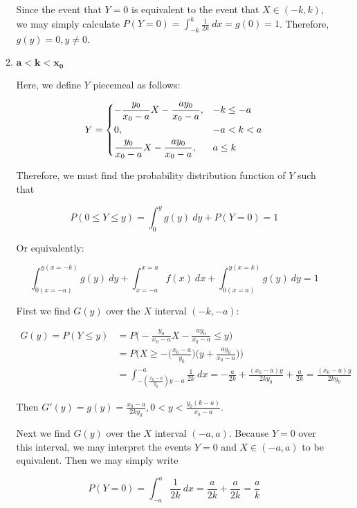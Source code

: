 \documentclass[10pt, oneside]{article}   	%
\theoremstyle{definition}
\begin{document}
\begin{enumerate}[label=5.\arabic*]
\begin{enumerate}
	Since the event that $Y = 0$ is equivalent to the event that $X \in (-k, k)$, we may simply calculate $P(Y = 0) = \int^k_{-k} \frac{1}{2k} \ dx = \boxed{g(0) = 1}$. Therefore, $\boxed{g(y) = 0}, y \neq 0$.
	
	\item  \begin{tcolorbox}[
	  colback=Cerulean!5!white,
	  colframe=Cerulean!75!black]
	\textbf{$\bm{a < k < x_0}$}
	\end{tcolorbox}
	
	Here, we define $Y$ piecemeal as follows:
	
	\[ Y = \begin{dcases}
	-\frac{y_0}{x_0 - a} X - \frac{ay_0}{x_0 - a}, & -k \leq -a \\
	0, &-a < k < a \\
	\frac{y_0}{x_0 - a} X - \frac{ay_0}{x_0 - a}, &a \leq k
	\end{dcases} \]
	
	Therefore, we must find the probability distribution function of $Y$ such that
	
	\[ P(0 \leq Y \leq y) =  \int^y_0 g(y) \ dy + P(Y = 0) = 1 \]
	
	Or equivalently:
	
	\[ \int^{y (x = -k)}_{0 (x = -a)} g(y) \ dy + \int^{x = a}_{x = -a} f(x) \ dx + \int^{y (x = k)}_{0 (x = a)} g(y) \ dy = 1 \]
	
	First we find $G(y)$ over the $X$ interval $(-k, -a)$:
	
	\begin{align*}
	G(y) = P(Y \leq y) &= P\Big( -\frac{y_0}{x_0 - a} X - \frac{ay_0}{x_0 - a} \leq y \Big) \\
	&= P \Big( X \geq - \Big( \frac{x_0 - a}{y_0} \Big) \Big( y + \frac{ay_0}{x_0 - a} \Big) \Big) \\
	&= \int^{-a}_{-(\frac{x_0 - a}{y_0}) y - a} \frac{1}{2k} \ dx = -\frac{a}{2k} + \frac{(x_0 - a)y}{2ky_0} + \frac{a}{2k} = \frac{(x_0 - a)y}{2ky_0}
	\end{align*}
	
	Then $G'(y) = g(y) = \boxed{\frac{x_0 - a}{2ky_0}, 0 < y < \frac{y_0 (k - a)}{x_0 - a}}$.
	
	Next we find $G(y)$ over the $X$ interval $(-a, a)$. Because $Y = 0$ over this interval, we may interpret the events $Y = 0$ and $X \in (-a,a)$ to be equivalent. Then we may simply write
	
	\[ P(Y = 0) = \int^a_{-a} \frac{1}{2k} \ dx = \frac{a}{2k} + \frac{a}{2k} = \boxed{\frac{a}{k}} \]
	

\end{enumerate}
\end{enumerate}
\end{document}
